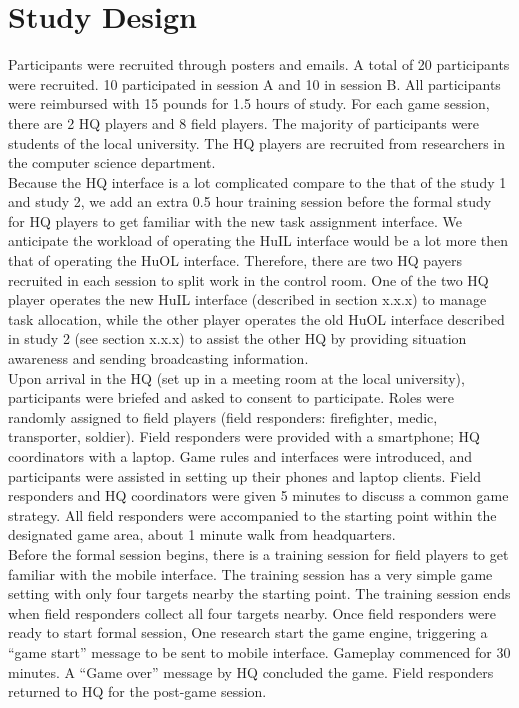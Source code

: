 \section{Study Design}
Participants were recruited through posters and emails. A total of 20 participants were recruited. 10 participated in session A and 10 in session B. All participants were reimbursed with 15 pounds for 1.5 hours of study. For each game session, there are 2 HQ players and 8 field players. The majority of participants were students of the local university. The HQ players are recruited from researchers in the computer science department. \\

Because the HQ interface is a lot complicated compare to the that of the study 1 and study 2, we add an extra 0.5 hour training session before the formal study for HQ players to get familiar with the new task assignment interface. We anticipate the workload of operating the HuIL interface would be a lot more then that of operating the HuOL interface. Therefore, there are two HQ payers recruited in each session to split work in the control room. One of the two HQ player operates the new HuIL interface (described in section x.x.x) to manage task allocation, while the other player operates the old HuOL interface described in study 2 (see section x.x.x) to assist the other HQ by providing situation awareness and sending broadcasting information. \\

Upon arrival in the HQ (set up in a meeting room at the local university), participants were briefed and asked to consent to participate. Roles were randomly assigned to field players (field responders: firefighter, medic, transporter, soldier). Field responders were provided with a smartphone; HQ coordinators with a laptop. Game rules and interfaces were introduced, and participants were assisted in setting up their phones and laptop clients. Field responders and HQ coordinators were given 5 minutes to discuss a common game strategy. All field responders were accompanied to the starting point within the designated game area, about 1 minute walk from headquarters.\\

Before the formal session begins, there is a training session for field players to get familiar with the mobile interface. The training session has a very simple game setting with only four targets nearby the starting point. The training session ends when field responders collect all four targets nearby. Once field responders were ready to start formal session, One research start the game engine, triggering a ``game start'' message to be sent to mobile interface. Gameplay commenced for 30 minutes. A ``Game over'' message by HQ concluded the game. Field responders returned to HQ for the post-game session.\\

